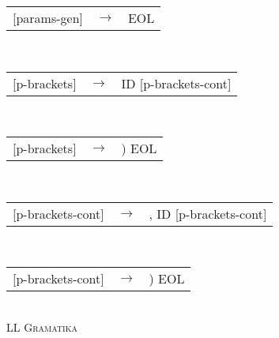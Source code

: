 \documentclass[11pt, a4paper]{article}
\begin{document}
\begin{algorithm}[H]
\begin{tabularx}{\textwidth}{l>{$}c<{$}X}
  {[params-gen]} &\rightarrow& EOL
\end{tabularx}\\ 
  \begin{tabularx}{\textwidth}{l>{$}c<{$}X}
  {[p-brackets]}   &\rightarrow& ID [p-brackets-cont] 
\end{tabularx}\\ 
  \begin{tabularx}{\textwidth}{l>{$}c<{$}X}
  {[p-brackets]}   &\rightarrow& ) EOL
\end{tabularx}\\ 
  \begin{tabularx}{\textwidth}{l>{$}c<{$}X}
  {[p-brackets-cont]}&\rightarrow& , ID [p-brackets-cont]
\end{tabularx}\\ 
  \begin{tabularx}{\textwidth}{l>{$}c<{$}X}
  {[p-brackets-cont]} &\rightarrow& ) EOL
\end{tabularx}\\ 

  \caption{\textsc{LL Gramatika}}
\end{algorithm}
\vspace{1em}
\newpage
\end{document}
